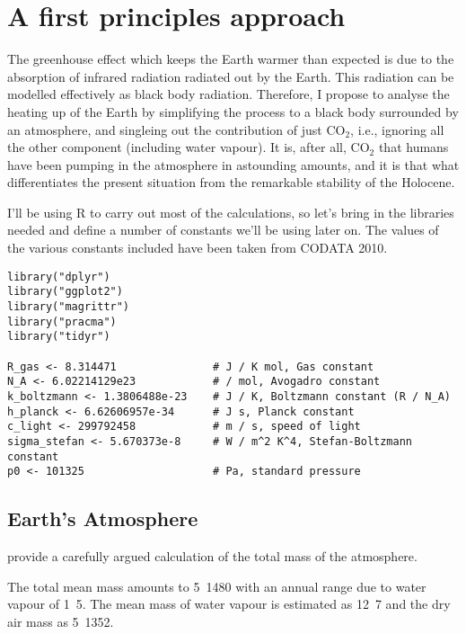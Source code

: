 \documentclass[10pt,a4paper,titlepage]{article}
\begin{document}
\section{A first principles approach}
\label{sec-3}

The greenhouse effect which keeps the Earth warmer than expected is
due to the absorption of infrared radiation radiated out by the
Earth. This radiation can be modelled effectively as black body
radiation. Therefore, I propose to analyse the heating up of the Earth
by simplifying the process to a black body surrounded by an
atmosphere, and singleing out the contribution of just CO$_{\text{2}}$, i.e.,
ignoring all the other component (including water vapour). It is,
after all, CO$_{\text{2}}$ that humans have been pumping in the atmosphere in
astounding amounts, and it is that what differentiates the present
situation from the remarkable stability of the Holocene.

I'll be using R to carry out most of the calculations, so let's bring
in the libraries needed and define a number of constants we'll be
using later on. The values of the various constants included have been
taken from CODATA 2010.

\begin{lstlisting}
library("dplyr")
library("ggplot2")
library("magrittr")
library("pracma")
library("tidyr")

R_gas <- 8.314471               # J / K mol, Gas constant
N_A <- 6.02214129e23            # / mol, Avogadro constant
k_boltzmann <- 1.3806488e-23    # J / K, Boltzmann constant (R / N_A)
h_planck <- 6.62606957e-34      # J s, Planck constant
c_light <- 299792458            # m / s, speed of light
sigma_stefan <- 5.670373e-8     # W / m^2 K^4, Stefan-Boltzmann constant
p0 <- 101325                    # Pa, standard pressure
\end{lstlisting}

\subsection{Earth's Atmosphere}
\label{sec-3-1}
\citet{trenberth-smith05:atmosphere} provide a carefully argued
calculation of the total mass of the atmosphere.

The total mean mass amounts to \unit{5.1480}{\exad\kilogram} with an
annual range due to water vapour of \unit{1.5}{\petad\kilogram}. The
mean mass of water vapour is estimated as \unit{12.7}{\petad\kilogram}
and the dry air mass as \unit{5.1352}{\exad\kilogram}.
\end{document}
